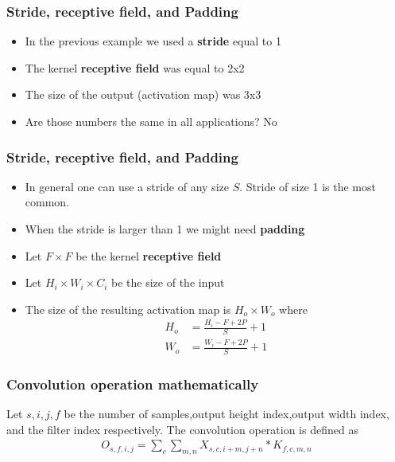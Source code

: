 \documentclass{beamer}
\begin{document}
\begin{frame}
    \frametitle{Stride, receptive field, and Padding}
\begin{itemize}
    \item In the previous example we used a \textbf{stride} equal to 1
    \item The kernel \textbf{receptive field} was equal to 2x2
    \item The size of the output (activation map) was 3x3
    \item Are those numbers the same in all applications? No
\end{itemize}
    

\end{frame}  
\begin{frame}
    \frametitle{Stride, receptive field, and Padding}
\begin{itemize}
    \item In general one can use a stride of any size $S$. Stride of size 1 is the most common.
    \item When the stride is larger than 1 we might need \textbf{padding}
    \item Let $F\times F$ be the kernel \textbf{receptive field} 
    \item Let $H_i\times W_i\times C_i$ be the size of the input
    \item The size of the resulting activation map is $H_o\times W_o$ where 
    \begin{align*}
        H_o&=\frac{H_i-F+2P}{S}+1\\
        W_o&=\frac{W_i-F+2P}{S}+1
    \end{align*}
\end{itemize}
    

\end{frame}      
\begin{frame}
    \frametitle{Convolution operation mathematically}

    Let $s,i,j,f$ be the number of samples,output height index,output width index, and the filter index respectively. The convolution operation is defined as
\begin{align*}
O_{s,f,i,j}=\sum_c\sum_{m,n}X_{s,c,i+m,j+n}*K_{f,c,m,n}
\end{align*}

\end{frame}
\end{document}
